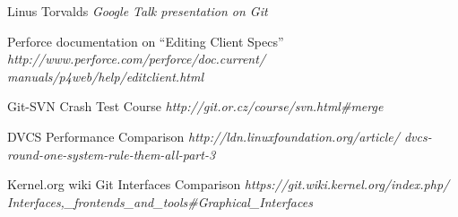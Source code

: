 \begin{thebibliography}{9}

Linus Torvalds \emph{Google Talk presentation on Git}

Perforce documentation on ``Editing Client Specs''
\emph{
http://www.perforce.com/perforce/doc.current/
manuals/p4web/help/editclient.html
}

Git-SVN Crash Test Course
\emph{http://git.or.cz/course/svn.html\#merge}

DVCS Performance Comparison
\emph{http://ldn.linuxfoundation.org/article/
dvcs-round-one-system-rule-them-all-part-3}

Kernel.org wiki Git Interfaces Comparison
\emph{https://git.wiki.kernel.org/index.php/
Interfaces,\_frontends\_and\_tools\#Graphical\_Interfaces}

% 
% 
% 
% 
\end{thebibliography}



